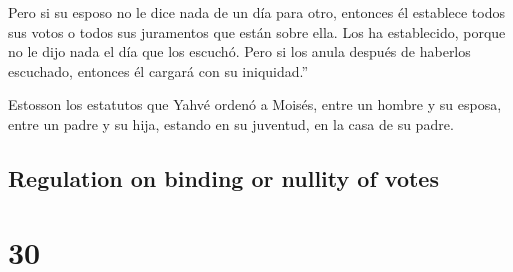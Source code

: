 \begin{paracol}{2}
 Pero si su esposo no le dice nada de un día para otro,
entonces él establece todos sus votos o todos sus juramentos que están
sobre ella. Los ha establecido, porque no le dijo nada el día que los
escuchó.  Pero si los anula después de haberlos
escuchado, entonces él cargará con su iniquidad.''

 Estosson los estatutos que Yahvé ordenó a Moisés, entre
un hombre y su esposa, entre un padre y su hija, estando en su juventud,
en la casa de su padre.

\switchcolumn
\begin{otherlanguage}{english}

\hypertarget{regulation-on-binding-or-nullity-of-votes}{%
\subsection{Regulation on binding or nullity of
votes}\label{regulation-on-binding-or-nullity-of-votes}}

\hypertarget{section-59}{%
\section{30}\label{section-59}}


\end{otherlanguage}
\end{paracol}
